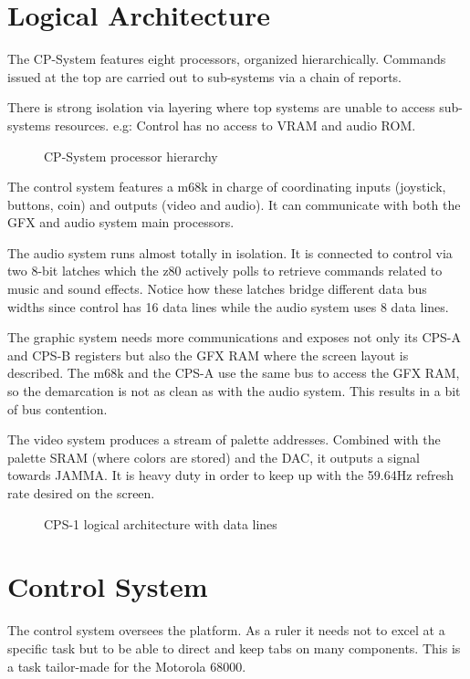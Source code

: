 \section{Logical Architecture}
The CP-System features eight processors, organized hierarchically. Commands issued at the top are carried out to sub-systems via a chain of reports. 

There is strong isolation via layering where top systems are unable to access sub-systems resources. e.g: Control has no access to VRAM and audio ROM.

\begin{figure}[H]
  \caption*{CP-System processor hierarchy}
  \end{figure}


The control system features a m68k in charge of coordinating inputs (joystick, buttons, coin) and outputs (video and audio). It can communicate with both the GFX and audio system main processors.

The audio system runs almost totally in isolation. It is connected to control via two 8-bit latches which the z80 actively polls to retrieve commands related to music and sound effects. Notice how these latches bridge different data bus widths since control has 16 data lines while the audio system uses 8 data lines.

The graphic system needs more communications and exposes not only its CPS-A and CPS-B registers but also the GFX RAM where the screen layout is described. The m68k and the CPS-A use the same bus to access the GFX RAM, so the demarcation is not as clean as with the audio system. This results in a bit of bus contention.  

The video system produces a stream of palette addresses. Combined with the palette SRAM (where colors are stored) and the DAC, it outputs a signal towards JAMMA. It is heavy duty in order to keep up with the 59.64Hz refresh rate desired on the screen.

\begin{figure}[H]
  \caption*{CPS-1 logical architecture with data lines}
  \label{cps1_arch}
  \end{figure}


\section{Control System}
The control system oversees the platform. As a ruler it needs not to excel at a specific task but to be able to direct and keep tabs on many components. This is a task tailor-made for the Motorola 68000.


